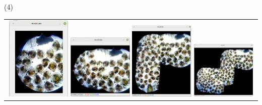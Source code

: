 \begin{frame}{ (4)}
\begin{center}
 \begin{tabular}{c}
         \includegraphics[width=0.24\textwidth]{2022_ConteoOstioncitos/figs/0049.png}
         \includegraphics[width=0.24\textwidth]{2022_ConteoOstioncitos/figs/0085.png}
         \includegraphics[width=0.24\textwidth]{2022_ConteoOstioncitos/figs/0193.png}
         \includegraphics[width=0.24\textwidth]{2022_ConteoOstioncitos/figs/0373.png}\\
          \end{tabular}
\end{center}
\end{frame}



